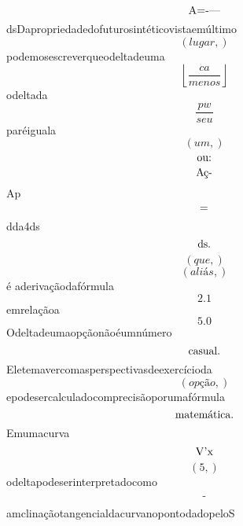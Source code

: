 \documentclass{article}
\begin{document}
\begin{equation}
$A=-—$
\end{equation}dsDapropriedadedofuturosintéticovistaemúltimo\begin{equation}
\left( lugar,\right)
\end{equation}podemosescreverqueodeltadeuma\begin{equation}
\left\lfloor{\frac{ca}{menos}}\right\rfloor
\end{equation}odeltada\begin{equation}
\frac{pw}{seu}
\end{equation}paréiguala\begin{equation}
\left( um,\right)
\end{equation}\begin{equation}
$ou:$
\end{equation}\begin{equation}
$Aç-$
\end{equation}Ap\begin{equation}
$=$
\end{equation}dda4ds\begin{equation}
$ds.$
\end{equation}\begin{equation}
\left( que,\right)
\end{equation}\begin{equation}
\left( aliás,\right)
\end{equation}é aderivaçãodafórmula\begin{equation}
2.1
\end{equation}emrelaçãoa\begin{equation}
5.0
\end{equation}Odeltadeumaopçãonãoéumnúmero\begin{equation}
$casual.$
\end{equation}Eletemavercomasperspectivasdeexercícioda\begin{equation}
\left( opção,\right)
\end{equation}epodesercalculadocomprecisãoporumafórmula\begin{equation}
$matemática.$
\end{equation}Emumacurva\begin{equation}
$V'x$
\end{equation}\begin{equation}
\left( 5,\right)
\end{equation}odeltapodeserinterpretadocomo\begin{equation}
$-$
\end{equation}amclinaçãotangencialdacurvanopontodadopeloS\begin{equation}

\end{equation}
\end{document}
